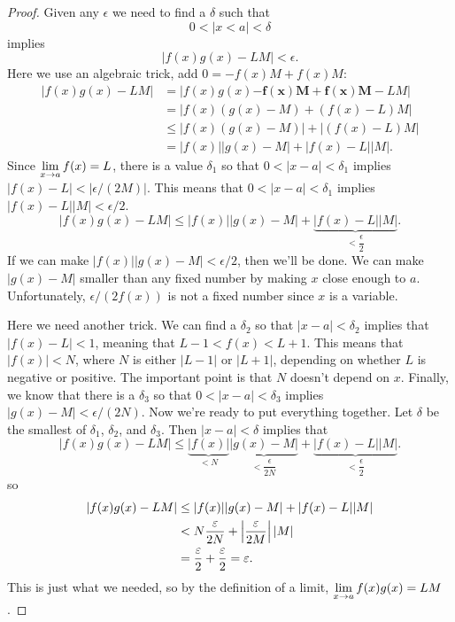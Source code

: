 \begin{proof} 
Given any $\epsilon$ we need to find a $\delta$ such that
\[
0<|x< a|< \delta
\]
implies 
\[
|f(x)g(x)-LM|< \epsilon.  
\]
Here we use an algebraic trick, add $0 = -f(x)M+f(x)M$:
\begin{align*}
|f(x)g(x)-LM| &= |f(x)g(x)\boldsymbol{-f(x)M+f(x)M}-LM| \\
&=|f(x)(g(x)-M)+(f(x)-L)M| \\
&\le |f(x)(g(x)-M)|+|(f(x)-L)M| \\
&=|f(x)||g(x)-M|+|f(x)-L||M|.
\end{align*}
Since $\ds \lim_{x\to a}f(x) =L$, there is a value $\delta_1$ so that
$0<|x-a|<\delta_1$ implies $|f(x)-L|<|\epsilon/(2M)|$. This means that
$0<|x-a|<\delta_1$ implies $|f(x)-L||M|< \epsilon/2$. 
\[
|f(x)g(x)-LM|\le|f(x)||g(x)-M|+\underbrace{|f(x)-L||M|}_{<\dfrac{\epsilon}{2}}.
\]
If we can make $|f(x)||g(x)-M|<\epsilon/2$, then we'll be done. We can
make $|g(x)-M|$ smaller than any fixed number by making $x$ close
enough to $a$. Unfortunately, $\epsilon/(2f(x))$ is not a fixed number
since $x$ is a variable.

Here we need another trick. We can find a $\delta_2$ so that
$|x-a|<\delta_2$ implies that $|f(x)-L|<1$, meaning that $L-1 < f(x) <
L+1$. This means that $|f(x)|<N$, where $N$ is either $|L-1|$ or
$|L+1|$, depending on whether $L$ is negative or positive. The
important point is that $N$ doesn't depend on $x$. Finally, we know
that there is a $\delta_3$ so that $0<|x-a|<\delta_3$ implies
$|g(x)-M|<\epsilon/(2N)$. Now we're ready to put everything
together. Let $\delta$ be the smallest of $\delta_1$, $\delta_2$, and
$\delta_3$. Then $|x-a|<\delta$ implies that
\[
|f(x)g(x)-LM|\le\underbrace{|f(x)|}_{<N}\underbrace{|g(x)-M|}_{<\dfrac{\epsilon}{2N}}+\underbrace{|f(x)-L||M|}_{<\dfrac{\epsilon}{2}}.
\]
so
\begin{align*}
|f(x)g(x)-LM|&\le|f(x)||g(x)-M|+|f(x)-L||M| \\
&<N{\epsilon\over 2N}+\left|{\epsilon\over 2M}\right||M| \\
&={\epsilon\over 2}+{\epsilon\over 2}=\epsilon.
\end{align*}
This is just what we needed, so by the definition of a limit,
$\ds \lim_{x\to a}f(x)g(x)=LM$.
\end{proof}



